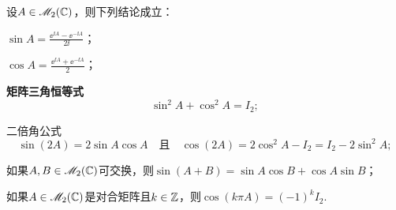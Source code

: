 \begin{lemma}[正弦和余弦函数的性质.]
  设$A\in\mathscr M_2(\mathbb C)$，则下列结论成立：
  \begin{enum}
    \item\label{lemma4.2a} $\sin A=\frac{\ee^{\ii A}-\ee^{-\ii A}}{2\ii}$；
    \item\label{lemma4.2b} $\cos A=\frac{\ee^{\ii A}+\ee^{-\ii A}}2$；
    \item {\bfseries 矩阵三角恒等式}
    \[
      \sin^2A + \cos^2A = I_2;
    \]
    \item {\kaishu 二倍角公式}
    \[
      \sin(2A) = 2\sin A\cos A\quad \text{且}
      \quad \cos(2A) = 2\cos^2A - I_2
      = I_2 - 2\sin^2A;
    \]
    \item 如果$A,B\in\mathscr M_2(\mathbb C)$可交换，则$\sin(A+B)
        =\sin A\cos B+\cos A\sin B$；
    \item 如果$A\in\mathscr M_2(\mathbb C)$是对合矩阵且$k\in\mathbb Z$，则$\cos(k\pi A)=(-1)^kI_2$.
  \end{enum}
\end{lemma}

